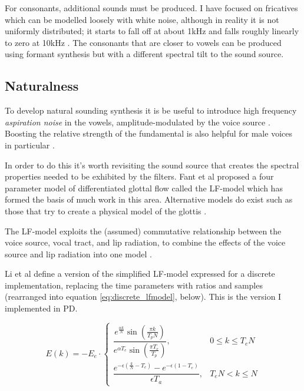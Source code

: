 For consonants, additional sounds must be produced. I have focused on fricatives which can be modelled loosely with white noise, although in reality it is not uniformly distributed; it starts to fall off at about 1kHz and falls roughly linearly to zero at 10kHz \cite{Johnson2003}. The consonants that are closer to vowels can be produced using formant synthesis but with a different spectral tilt to the sound source.

\subsection{Naturalness}

To develop natural sounding synthesis it is be useful to introduce high frequency \textit{aspiration noise} in the vowels, amplitude-modulated by the voice source \cite{Klatt1990}. Boosting the relative strength of the fundamental is also helpful for male voices in particular \cite{Klatt1990}.

In order to do this it's worth revisiting the sound source that creates the spectral properties needed to be exhibited by the filters. Fant et al proposed \cite{Fant1985} a four parameter model of differentiated glottal flow called the LF-model which has formed the basis of much work in this area. Alternative models do exist such as those that try to create a physical model of the glottis \cite{Liljencrants1995}.

The LF-model exploits the (assumed) commutative relationship between the voice source, vocal tract, and lip radiation, to combine the effects of the voice source and lip radiation into one model \cite{DelPozo2008}.

Li et al \cite{Li2011} define a version of the simplified LF-model expressed for a discrete implementation, replacing the time parameters with ratios and samples (rearranged into equation \ref{eq:discrete_lfmodel}, below). This is the version I implemented in PD.
 
\begin{equation}%
\label{eq:discrete_lfmodel}%
	E(k) = -E_e \cdot
	\begin{cases}
		\dfrac{e^{\frac{\alpha k}{N}} \sin ( \frac{\pi k}{ T_p N} )}{e^{\alpha T_e} \sin (\frac{\pi T_e}{T_p})}, & 0 \leq k \leq T_e N \\
		\dfrac{e^{-\epsilon(\frac{k}{N} - T_e)} - e^{-\epsilon(1-T_e)}}{\epsilon T_a}, & T_e N < k \leq N
	\end{cases}	
\end{equation}

